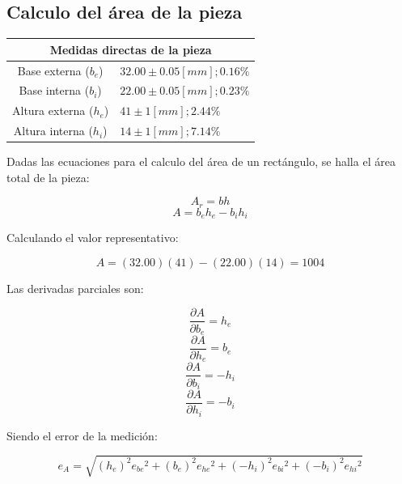 \documentclass[letter,11pt]{article}
\begin{document}
\subsection{Calculo del área de la pieza}
\vspace*{0.25cm}
\begin{center}
\begin{tabular}{|c|>{\centering}m{5.0cm}<{\centering}|}
\hline
\multicolumn{2}{|c|}{\textbf{Medidas directas de la pieza}}
\tabularnewline \hline
  Base externa ($b_e$) & $32.00 \pm 0.05 [mm]; 0.16\%$ \tabularnewline \hline
  Base interna ($b_i$) & $22.00 \pm 0.05 [mm]; 0.23\%$ \tabularnewline \hline
Altura externa ($h_e$) & $41    \pm 1    [mm]; 2.44\%$ \tabularnewline \hline
Altura interna ($h_i$) & $14    \pm 1    [mm]; 7.14\%$ \tabularnewline \hline
\end{tabular}
\end{center}

Dadas las ecuaciones para el calculo del área de un rectángulo, se halla el
área total de la pieza:

\begin{equation}
    A_r = b h
\tag{rectangulo}
\end{equation}
\begin{equation}
    A = b_e h_e - b_i h_i
\end{equation}

Calculando el valor representativo:

\begin{equation*}
    A = (32.00)(41) - (22.00)(14) = 1004
\end{equation*}

Las derivadas parciales son:

\begin{equation}
    \frac{\partial{A}}{\partial{b_e}} = h_e
\end{equation}
\begin{equation}
    \frac{\partial{A}}{\partial{h_e}} = b_e
\end{equation}
\begin{equation}
    \frac{\partial{A}}{\partial{b_i}} = -h_i
\end{equation}
\begin{equation}
    \frac{\partial{A}}{\partial{h_i}} = -b_i
\end{equation}

Siendo el error de la medición:

\begin{equation}
    e_A = \sqrt{
        \left(h_e\right)^2{e_{be}}^2+
        \left(b_e\right)^2{e_{he}}^2+
        \left(-h_i\right)^2{e_{bi}}^2+
        \left(-b_i\right)^2{e_{hi}}^2
    }
\end{equation}
\end{document}
